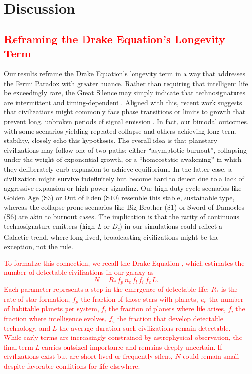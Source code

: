 \section{Discussion}\label{discussion}

\textcolor{red}{\subsection{Reframing the Drake Equation's Longevity Term}\label{reframing-drake}}

Our results reframe the Drake Equation's longevity term in a way that addresses the Fermi Paradox with greater nuance. Rather than requiring that intelligent life be exceedingly rare, the Great Silence may simply indicate that technosignatures are intermittent and timing-dependent \citep{Balbi2018-fp}. Aligned with this, recent work suggests that civilizations might commonly face phase transitions or limits to growth that prevent long, unbroken periods of signal emission \citep{Wong2022-hv}. In fact, our bimodal outcomes, with some scenarios yielding repeated collapse and others achieving long-term stability, closely echo this hypothesis. The overall idea is that planetary civilizations may follow one of two paths: either ``asymptotic burnout'', collapsing under the weight of exponential growth, or a ``homeostatic awakening'' in which they deliberately curb expansion to achieve equilibrium. In the latter case, a civilization might survive indefinitely but become hard to detect due to a lack of aggressive expansion or high-power signaling. Our high duty-cycle scenarios like Golden Age (S3) or Out of Eden (S10) resemble this stable, sustainable type, whereas the collapse-prone scenarios like Big Brother (S1) or Sword of Damocles (S6) are akin to burnout cases. The implication is that the rarity of continuous technosignature emitters (high \emph{L} or \emph{D\textsubscript{c}}) in our simulations could reflect a Galactic trend, where long-lived, broadcasting civilizations might be the exception, not the rule.

\textcolor{red}{To formalize this connection, we recall the Drake Equation \citep{Drake1965-wp}, which estimates the number of detectable civilizations in our galaxy as}
\textcolor{red}{\begin{equation}
N = R_*\, f_p\, n_e\, f_l\, f_i\, f_c\, L .
\label{eq:drake}
\end{equation}}
\textcolor{red}{Each parameter represents a step in the emergence of detectable life: \(R_{*}\) is the rate of star formation, \(f_{p}\) the fraction of those stars with planets, \(n_{e}\) the number of habitable planets per system, \(f_{l}\) the fraction of planets where life arises, \(f_{i}\) the fraction where intelligence evolves, \(f_{c}\) the fraction that develop detectable technology, and \(L\) the average duration such civilizations remain detectable. While early terms are increasingly constrained by astrophysical observation, the final term \emph{L} carries outsized importance and remains deeply uncertain. If civilizations exist but are short-lived or frequently silent, \(N\) could remain small despite favorable conditions for life elsewhere.}


